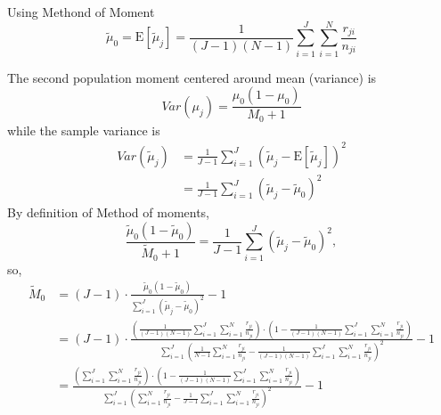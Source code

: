 \documentclass[11pt,reqno]{amsart}
\begin{document}
Using Methond of Moment
\begin{equation}
  \tilde{\mu}_0 = \text{E}[\tilde{\mu}_j] = \frac{1}{(J-1)(N-1)}\sum_{i=1}^J\sum_{i=1}^N\frac{r_{ji}}{n_{ji}}
\end{equation}

The second population moment centered around mean (variance) is
\begin{equation}
 Var(\mu_j) = \frac{\mu_0(1-\mu_0)}{M_0+1}
\end{equation}
while the sample variance is
\begin{equation}
 \begin{split}
  Var(\tilde{\mu}_j) &= \frac{1}{J-1}\sum_{i=1}^J(\tilde{\mu}_j-\text{E}[\tilde{\mu}_j])^2\\ &= \frac{1}{J-1}\sum_{i=1}^J(\tilde{\mu}_j-\tilde{\mu}_0)^2
 \end{split}
\end{equation}
By definition of Method of moments,
\begin{equation}
  \frac{\tilde{\mu}_0(1-\tilde{\mu}_0)}{\tilde{M}_0+1} = \frac{1}{J-1}\sum_{i=1}^J(\tilde{\mu}_j-\tilde{\mu}_0)^2,
\end{equation}
so,
\begin{equation}
\begin{split}
 \tilde{M}_0 &= (J-1)\cdot\frac{\tilde{\mu}_0(1-\tilde{\mu}_0)}{\sum_{i=1}^J(\tilde{\mu}_j-\tilde{\mu}_0)^2}-1\\ &= (J-1)\cdot\frac{\left(\frac{1}{(J-1)(N-1)}\sum_{i=1}^J\sum_{i=1}^N\frac{r_{ji}}{n_{ji}}\right)\cdot\left(1-\frac{1}{(J-1)(N-1)}\sum_{i=1}^J\sum_{i=1}^N\frac{r_{ji}}{n_{ji}}\right)}{\sum_{i=1}^J\left(\frac{1}{N-1}\sum_{i=1}^N\frac{r_{ji}}{n_{ji}}-\frac{1}{(J-1)(N-1)}\sum_{i=1}^J\sum_{i=1}^N\frac{r_{ji}}{n_{ji}}\right)^2}-1\\ &= \frac{\left(\sum_{i=1}^J\sum_{i=1}^N\frac{r_{ji}}{n_{ji}}\right)\cdot\left(1-\frac{1}{(J-1)(N-1)}\sum_{i=1}^J\sum_{i=1}^N\frac{r_{ji}}{n_{ji}}\right)}{\sum_{i=1}^J\left(\sum_{i=1}^N\frac{r_{ji}}{n_{ji}}-\frac{1}{J-1}\sum_{i=1}^J\sum_{i=1}^N\frac{r_{ji}}{n_{ji}}\right)^2}-1
\end{split}
\end{equation}


\end{document}
